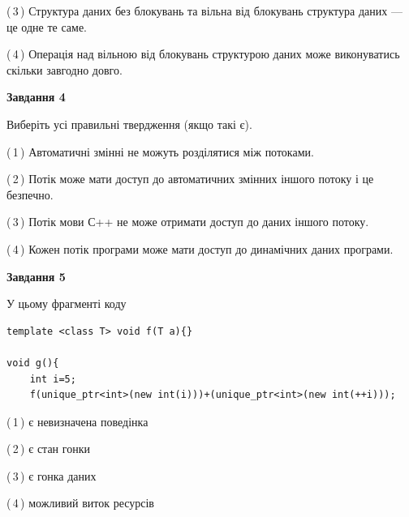 \documentclass[12pt, ukrainian]{article}
\begin{document}
\begin {large}
{(\,3\,) Структура даних без блокувань та вільна від блокувань структура даних --- це одне те саме.%

(\,4\,) Операція над вільною від блокувань структурою даних може виконуватись скільки завгодно довго.%



\begin{center}
\textbf{Завдання 4}
\end{center}
Виберіть усі правильні твердження (якщо такі є).\par
\vspace{2mm}

(\,1\,) Автоматичні змінні не можуть розділятися між потоками.%

(\,2\,) Потік може мати доступ до автоматичних змінних іншого потоку і це безпечно.%

(\,3\,) Потік мови С++ не може отримати доступ до даних іншого потоку.%

(\,4\,) Кожен потік програми може мати доступ до динамічних даних програми.%



\begin{center}
\textbf{Завдання 5}
\end{center}
У цьому фрагменті коду
\begin{verbatim}
template <class T> void f(T a){}

void g(){
    int i=5;
    f(unique_ptr<int>(new int(i)))+(unique_ptr<int>(new int(++i)));
\end{verbatim}
(\,1\,) є невизначена поведінка%

(\,2\,) є стан гонки%

(\,3\,) є гонка даних%

(\,4\,) можливий виток ресурсів%


}
\end {large}
\end{document}
